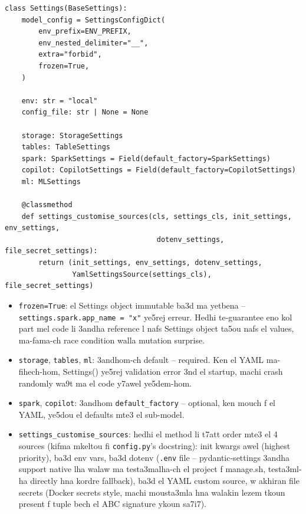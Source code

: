 \documentclass[11pt,a4paper]{report}
\DeclareRobustCommand{\code}[1]{\texttt{#1}}
\begin{document}
\begin{lstlisting}[style=pystyle]
class Settings(BaseSettings):
    model_config = SettingsConfigDict(
        env_prefix=ENV_PREFIX,
        env_nested_delimiter="__",
        extra="forbid",
        frozen=True,
    )

    env: str = "local"
    config_file: str | None = None

    storage: StorageSettings
    tables: TableSettings
    spark: SparkSettings = Field(default_factory=SparkSettings)
    copilot: CopilotSettings = Field(default_factory=CopilotSettings)
    ml: MLSettings

    @classmethod
    def settings_customise_sources(cls, settings_cls, init_settings, env_settings,
                                    dotenv_settings, file_secret_settings):
        return (init_settings, env_settings, dotenv_settings,
                YamlSettingsSource(settings_cls), file_secret_settings)
\end{lstlisting}

\begin{itemize}
  \item \code{frozen=True}: el Settings object immutable ba3d ma yetbena --
        \code{settings.spark.app\_name = "x"} ye5rej erreur. Hedhi te-guarantee
        eno kol part mel code li 3andha reference l nafs Settings object ta5ou
        nafs el values, ma-fama-ch race condition walla mutation surprise.
  \item \code{storage}, \code{tables}, \code{ml}: 3andhom-ch default -- required.
        Ken el YAML ma-fihech-hom, Settings() ye5rej validation error 3nd
        el startup, machi crash randomly wa9t ma el code y7awel ye5dem-hom.
  \item \code{spark}, \code{copilot}: 3andhom \code{default\_factory} -- optional,
        ken mouch f el YAML, ye5dou el defaults mte3 el sub-model.
  \item \code{settings\_customise\_sources}: hedhi el method li t7att order mte3
        el 4 sources (kifma mkeltou fi \code{config.py}'s docstring): init kwargs
        awel (highest priority), ba3d env vars, ba3d dotenv (\code{.env} file --
        pydantic-settings 3andha support native l\-ha walaw ma testa3malha-ch
        el project f manage.sh, testa3ml-ha directly hna kordre fallback),
        ba3d el YAML custom source, w akhiran file secrets (Docker secrets style,
        machi mousta3mla hna walakin lezem tkoun present f tuple bech el ABC
        signature ykoun sa7i7).
\end{itemize}
\end{document}
